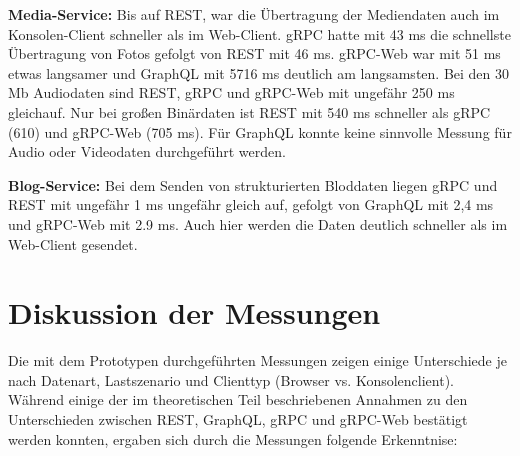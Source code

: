 \textbf{Media-Service:}  
Bis auf REST, war die Übertragung der Mediendaten auch im Konsolen-Client schneller als im Web-Client. gRPC hatte mit 43 ms die schnellste Übertragung von Fotos gefolgt von REST mit 46 ms. gRPC-Web war mit 51 ms etwas langsamer und GraphQL mit 5716 ms deutlich am langsamsten. Bei den 30 Mb Audiodaten sind REST, gRPC und gRPC-Web mit ungefähr 250 ms gleichauf. Nur bei großen Binärdaten ist REST mit 540 ms schneller als gRPC (610) und gRPC-Web (705 ms). Für GraphQL konnte keine sinnvolle Messung für Audio oder Videodaten durchgeführt werden.

\textbf{Blog-Service:}  
Bei dem Senden von strukturierten Bloddaten liegen gRPC und REST mit ungefähr 1 ms ungefähr gleich auf, gefolgt von GraphQL mit 2,4 ms und gRPC-Web mit 2.9 ms. Auch hier werden die Daten deutlich schneller als im Web-Client gesendet.

\clearpage
\section*{Diskussion der Messungen}
Die mit dem Prototypen durchgeführten Messungen zeigen einige Unterschiede je nach Datenart, Lastszenario und Clienttyp (Browser vs. Konsolenclient). Während einige der im theoretischen Teil beschriebenen Annahmen zu den Unterschieden zwischen REST, GraphQL, gRPC und gRPC-Web bestätigt werden konnten, ergaben sich durch die Messungen folgende Erkenntnise:

